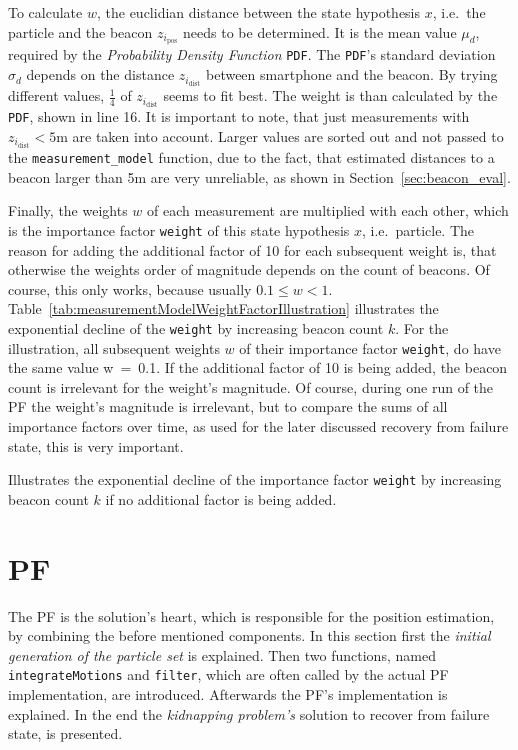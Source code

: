 

To calculate $w$, the euclidian distance between the state hypothesis $x$, i.e.\ the particle and  the beacon $z_{i_\text{pos}}$ needs to be determined. It is the mean value $\mu_d$, required by the \emph{Probability Density Function} \texttt{PDF}. The \texttt{PDF}'s standard deviation $\sigma_d$ depends on the distance $z_{i_\text{dist}}$ between smartphone and the beacon. By trying different values, $\frac{1}{4}$ of $z_{i_\text{dist}}$ seems to fit best. The weight is than calculated by the \texttt{PDF}, shown in line 16. It is important to note, that just measurements with $z_{i_\text{dist}} < 5\text{m}$ are taken into account. Larger values are sorted out and not passed to the \texttt{measurement\_model} function, due to the fact, that estimated distances to a beacon larger than 5m are very unreliable, as shown in Section~\ref{sec:beacon_eval}.

Finally, the weights $w$ of each measurement are multiplied with each other, which is the importance factor \texttt{weight} of this state hypothesis $x$, i.e.\ particle. The reason for adding the additional factor of 10 for each subsequent weight is, that otherwise the weights order of magnitude depends on the count of beacons. Of course, this only works, because usually $0.1 \leq w < 1$. Table~\ref{tab:measurementModelWeightFactorIllustration} illustrates the exponential decline of the \texttt{weight} by increasing beacon count $k$. For the illustration, all subsequent weights $w$ of their importance factor \texttt{weight}, do have the same value w~=~0.1. If the additional factor of 10 is being added, the beacon count is irrelevant for the weight's magnitude. Of course, during one run of the \acl{PF} the weight's magnitude is irrelevant, but to compare the sums of all importance factors over time, as used for the later discussed recovery from failure state, this is very important.

\begin{table}
	
	\caption{Illustrates the exponential decline of the importance factor \texttt{weight} by increasing beacon count $k$ if no additional factor is being added.}
	\label{tab:measurementModelWeightFactorIllustration}
\end{table}


\section{\acl{PF}}\label{sec:algo_pf}
The \acl{PF} is the solution's heart, which is responsible for the position estimation, by combining the before mentioned components. In this section first the \emph{initial generation of the particle set} is explained. Then two functions, named \texttt{integrateMotions} and \texttt{filter}, which are often called by the actual \ac{PF} implementation, are introduced. Afterwards the \ac{PF}'s implementation is explained. In the end the \emph{kidnapping problem's} solution to recover from failure state, is presented.


